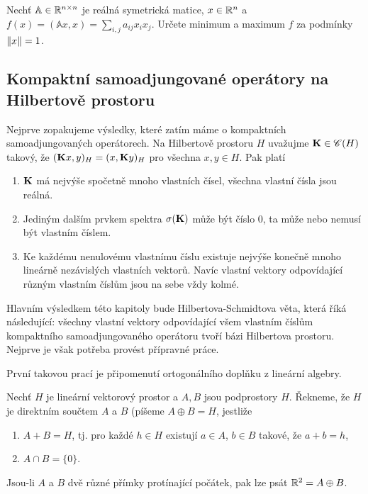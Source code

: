 \begin{exercise}
Nechť $\mathbb{A} \in \mathbb{R}^{n \times n}$ je reálná symetrická matice, $x \in \mathbb{R}^n$ a $f(x) = (\mathbb{A} x,x) = \sum_{i,j} a_{ij} x_i x_j$. Určete minimum a maximum $f$ za podmínky $\left\lVert x\right\rVert =1$.
\end{exercise}

\subsection{Kompaktní samoadjungované operátory na Hilbertově prostoru}

Nejprve zopakujeme výsledky, které zatím máme o kompaktních samoadjungovaných operátorech. Na Hilbertově prostoru $H$ uvažujme $\mathbf{K} \in \mathscr{C} (H)$ takový, že $(\mathbf{K} x,y)_H = (x, \mathbf{K} y)_H$ pro všechna $x,y \in H$. Pak platí \begin{enumerate}
    \item $\mathbf{K}$ má nejvýše spočetně mnoho vlastních čísel, všechna vlastní čísla jsou reálná.
    \item Jediným dalším prvkem spektra $\sigma(\mathbf{K})$ může být číslo $0$, ta může nebo nemusí být vlastním číslem.
    \item Ke každému nenulovému vlastnímu číslu existuje nejvýše konečně mnoho lineárně nezávislých vlastních vektorů. Navíc vlastní vektory odpovídající různým vlastním číslům jsou na sebe vždy kolmé.
\end{enumerate}

Hlavním výsledkem této kapitoly bude Hilbertova-Schmidtova věta, která říká následující: všechny vlastní vektory odpovídající všem vlastním číslům kompaktního samoadjungovaného operátoru tvoří bázi Hilbertova prostoru. Nejprve je však potřeba provést přípravné práce.

První takovou prací je připomenutí ortogonálního doplňku z lineární algebry.
\begin{definition}
Nechť $H$ je lineární vektorový prostor a $A,B$ jsou podprostory $H$. Řekneme, že $H$ je direktním součtem $A$ a $B$ (píšeme $A \oplus B = H$, jestliže \begin{enumerate}
    \item $A+B=H$, tj. pro každé $h \in H$ existují $a \in A$, $b \in B$ takové, že $a+b=h$,
    \item $A \cap B = \{0 \}$.
\end{enumerate}
\end{definition}

\begin{example}
Jsou-li $A$ a $B$ dvě různé přímky protínající počátek, pak lze psát $\mathbb{R}^2 = A \oplus B$.
\end{example}

